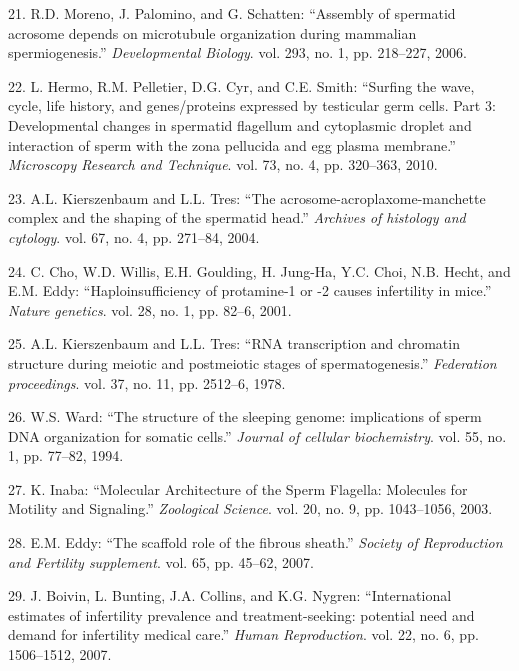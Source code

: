 \documentclass[12pt,twoside]{reedthesis}
\theoremstyle{definition}
\theoremstyle{definition}
\theoremstyle{remark}
\begin{document}
  \hypertarget{ref-Moreno2006}{}
  21. R.D. Moreno, J. Palomino, and G. Schatten: ``Assembly of spermatid
  acrosome depends on microtubule organization during mammalian
  spermiogenesis.'' \emph{Developmental Biology}. vol. 293, no. 1, pp.
  218--227, 2006.
  
  \hypertarget{ref-Hermo2010}{}
  22. L. Hermo, R.M. Pelletier, D.G. Cyr, and C.E. Smith: ``Surfing the
  wave, cycle, life history, and genes/proteins expressed by testicular
  germ cells. Part 3: Developmental changes in spermatid flagellum and
  cytoplasmic droplet and interaction of sperm with the zona pellucida and
  egg plasma membrane.'' \emph{Microscopy Research and Technique}. vol.
  73, no. 4, pp. 320--363, 2010.
  
  \hypertarget{ref-Kierszenbaum2004}{}
  23. A.L. Kierszenbaum and L.L. Tres: ``The
  acrosome-acroplaxome-manchette complex and the shaping of the spermatid
  head.'' \emph{Archives of histology and cytology}. vol. 67, no. 4, pp.
  271--84, 2004.
  
  \hypertarget{ref-Cho2001}{}
  24. C. Cho, W.D. Willis, E.H. Goulding, H. Jung-Ha, Y.C. Choi, N.B.
  Hecht, and E.M. Eddy: ``Haploinsufficiency of protamine-1 or -2 causes
  infertility in mice.'' \emph{Nature genetics}. vol. 28, no. 1, pp.
  82--6, 2001.
  
  \hypertarget{ref-Kierszenbaum1978}{}
  25. A.L. Kierszenbaum and L.L. Tres: ``RNA transcription and chromatin
  structure during meiotic and postmeiotic stages of spermatogenesis.''
  \emph{Federation proceedings}. vol. 37, no. 11, pp. 2512--6, 1978.
  
  \hypertarget{ref-Ward1994}{}
  26. W.S. Ward: ``The structure of the sleeping genome: implications of
  sperm DNA organization for somatic cells.'' \emph{Journal of cellular
  biochemistry}. vol. 55, no. 1, pp. 77--82, 1994.
  
  \hypertarget{ref-Inaba2003}{}
  27. K. Inaba: ``Molecular Architecture of the Sperm Flagella: Molecules
  for Motility and Signaling.'' \emph{Zoological Science}. vol. 20, no. 9,
  pp. 1043--1056, 2003.
  
  \hypertarget{ref-Eddy2007}{}
  28. E.M. Eddy: ``The scaffold role of the fibrous sheath.''
  \emph{Society of Reproduction and Fertility supplement}. vol. 65, pp.
  45--62, 2007.
  
  \hypertarget{ref-Boivin2007a}{}
  29. J. Boivin, L. Bunting, J.A. Collins, and K.G. Nygren:
  ``International estimates of infertility prevalence and
  treatment-seeking: potential need and demand for infertility medical
  care.'' \emph{Human Reproduction}. vol. 22, no. 6, pp. 1506--1512, 2007.
  
\end{document}
